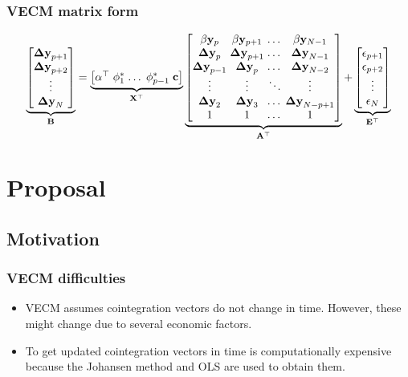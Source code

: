 \documentclass[compress,red]{beamer}
\begin{document}
\begin{frame}
\frametitle{VECM matrix form}
\small
\begin{equation*}
\underbrace{
      \begin{bmatrix}
       \mathbf{\Delta y}_{p+1}  \\ 
       \mathbf{\Delta y}_{p+2}  \\ 
       \vdots                   \\ 
       \mathbf{\Delta y}_N      
      \end{bmatrix}}_{\mathbf{B} } =
\arraycolsep=1.4pt  
\underbrace{\begin{bmatrix}
   \alpha^\top & \phi^*_1 & \dots & \phi^*_{p-1} &\mathbf{c}   
  \end{bmatrix}}_{\mathbf{X}^\top}
\underbrace{\begin{bmatrix}
 \beta\mathbf{y}_p      & \beta\mathbf{y}_{p+1}   & \dots&   \beta\mathbf{y}_{N-1}   \\
 \mathbf{\Delta y}_{p}   & \mathbf{\Delta y}_{p+1}& \dots &  \mathbf{\Delta y}_{N-1} \\
 \mathbf{\Delta y}_{p-1} & \mathbf{\Delta y}_{p}  & \dots &  \mathbf{\Delta y}_{N-2}   \\
 \vdots                  & \vdots                 & \ddots&  \vdots                   \\
 \mathbf{\Delta y}_{2}   & \mathbf{\Delta y}_{3} & \dots &   \mathbf{\Delta y}_{N-p+1} \\
 1                      & 1                       & \dots     & 1   
 \end{bmatrix}}_{\mathbf{A}^\top}
+
\underbrace{\begin{bmatrix}
              \mathbf{\epsilon}_{p+1} \\ 
              \mathbf{\epsilon}_{p+2} \\ 
              \vdots \\ 
              \mathbf{\epsilon}_N
             \end{bmatrix}}_{\mathbf{E}^\top}
\end{equation*}
\end{frame}

\section{Proposal}
\subsection{Motivation}
\begin{frame}
\frametitle{VECM difficulties}
\begin{itemize}
\item VECM assumes cointegration vectors do not change in time. However, these might change due to several economic factors.
\item To get updated cointegration vectors in time is computationally expensive because 
the Johansen method and OLS are used to obtain them.
\end{itemize}
\end{frame}
\end{document}

